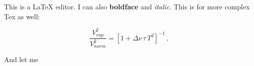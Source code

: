 This is a LaTeX editor. I can also \textbf{boldface} and \textit{italic}. This is for more complex Tex as well:

\begin{equation}
\frac{V_{ sup}^2}{V_{ norm}^2} = [1 + \Delta \nu \, \tau \, T^2 ]^{-1} \, ,
\end{equation}

And let me 